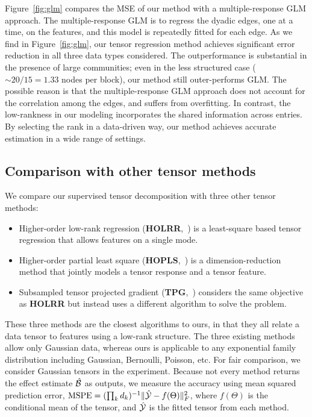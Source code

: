 \documentclass[12pt]{article}
\theoremstyle{definition}
\theoremstyle{definition}
\begin{document}
Figure~\ref{fig:glm} compares the MSE of our method with a multiple-response GLM approach. The multiple-response GLM is to regress the dyadic edges, one at a time, on the features, and this model is repeatedly fitted for each edge. As we find in Figure~\ref{fig:glm}, our tensor regression method achieves significant error reduction in all three data types considered. The outperformance is substantial in the presence of large communities; even in the less structured case ($\sim 20/15=1.33$ nodes per block), our method still outer-performs GLM. The possible reason is that the multiple-response GLM approach does not account for the correlation among the edges, and suffers from overfitting. In contrast, the low-rankness in our modeling incorporates the shared information across entries. By selecting the rank in a data-driven way, our method achieves accurate estimation in a wide range of settings. 

\subsection{Comparison with other tensor methods}
We compare our supervised tensor decomposition with three other tensor methods:
\begin{itemize}[noitemsep,topsep=0pt]
\item  Higher-order low-rank regression ({\bf HOLRR},~\citet{rabusseau2016low}) is a least-square based tensor regression that allows features on a single mode. 
\item Higher-order partial least square ({\bf HOPLS},~\citet{zhao2012higher}) is a dimension-reduction method that jointly models a tensor response and a tensor feature. 
\item Subsampled tensor projected gradient ({\bf TPG},~\citet{yu2016learning}) considers the same objective as {\bf HOLRR} but instead uses a different algorithm to solve the problem. 
\end{itemize}
These three methods are the closest algorithms to ours, in that they all relate a data tensor to features using a low-rank structure. The three existing methods allow only Gaussian data, whereas ours is applicable to any exponential family distribution including Gaussian, Bernoulli, Poisson, etc. For fair comparison, we consider Gaussian tensors in the experiment. Because not every method returns the effect estimate $\hat {\mathcal{B}}$ as outputs, we measure the accuracy using mean squared prediction error, $\text{MSPE}=(\prod_kd_k)^{-1}\lVert\hat {\mathcal{Y}}-f(\Theta)\rVert_F^2$, where $f(\Theta)$ is the conditional mean of the tensor, and $\hat {\mathcal{Y}}$ is the fitted tensor from each method. 
\end{document}
